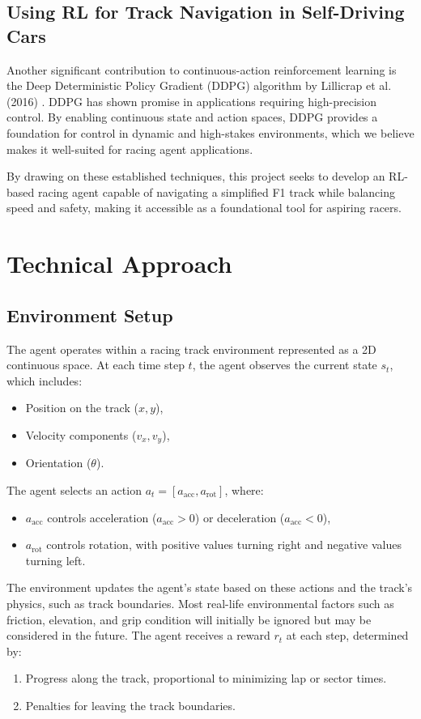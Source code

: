 \documentclass{article}
\begin{document}
\subsection{Using RL for Track Navigation in Self-Driving Cars}
Another significant contribution to continuous-action reinforcement learning is the Deep Deterministic Policy Gradient (DDPG) algorithm by Lillicrap et al. (2016) \cite{lillicrap2015continuous}. DDPG has shown promise in applications requiring high-precision control. By enabling continuous state and action spaces, DDPG provides a foundation for control in dynamic and high-stakes environments, which we believe makes it well-suited for racing agent applications.

By drawing on these established techniques, this project seeks to develop an RL-based racing agent capable of navigating a simplified F1 track while balancing speed and safety, making it accessible as a foundational tool for aspiring racers.


\section{Technical Approach}
\subsection{Environment Setup}
The agent operates within a racing track environment represented as a 2D continuous space. At each time step \(t\), the agent observes the current state \(s_t\), which includes:
\begin{itemize}
    \item Position on the track (\(x, y\)),
    \item Velocity components (\(v_x, v_y\)),
    \item Orientation (\(\theta\)).
\end{itemize}

The agent selects an action \(a_t = [a_{\text{acc}}, a_{\text{rot}}]\), where:
\begin{itemize}
    \item \(a_{\text{acc}}\) controls acceleration (\(a_{\text{acc}} > 0\)) or deceleration (\(a_{\text{acc}} < 0\)),
    \item \(a_{\text{rot}}\) controls rotation, with positive values turning right and negative values turning left.
\end{itemize}

The environment updates the agent’s state based on these actions and the track's physics, such as track boundaries. Most real-life environmental factors such as friction, elevation, and grip condition will initially be ignored but may be considered in the future. The agent receives a reward \(r_t\) at each step, determined by:
\begin{enumerate}
    \item Progress along the track, proportional to minimizing lap or sector times.
    \item Penalties for leaving the track boundaries.
\end{enumerate}
\end{document}
